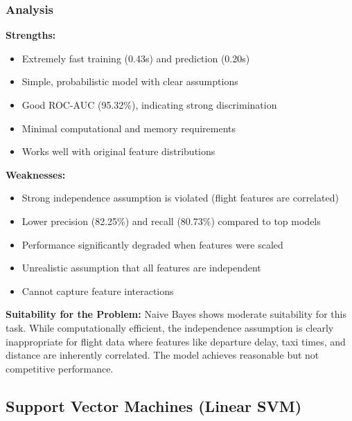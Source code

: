 \documentclass[sigconf]{acmart}
\begin{document}
\subsubsection{Analysis}
\textbf{Strengths:}
\begin{itemize}
    \item Extremely fast training (0.43s) and prediction (0.20s)
    \item Simple, probabilistic model with clear assumptions
    \item Good ROC-AUC (95.32\%), indicating strong discrimination
    \item Minimal computational and memory requirements
    \item Works well with original feature distributions
\end{itemize}

\textbf{Weaknesses:}
\begin{itemize}
    \item Strong independence assumption is violated (flight features are correlated)
    \item Lower precision (82.25\%) and recall (80.73\%) compared to top models
    \item Performance significantly degraded when features were scaled
    \item Unrealistic assumption that all features are independent
    \item Cannot capture feature interactions
\end{itemize}

\textbf{Suitability for the Problem:} Naive Bayes shows moderate suitability for this task. While computationally efficient, the independence assumption is clearly inappropriate for flight data where features like departure delay, taxi times, and distance are inherently correlated. The model achieves reasonable but not competitive performance.

\subsection{Support Vector Machines (Linear SVM)}
\end{document}
